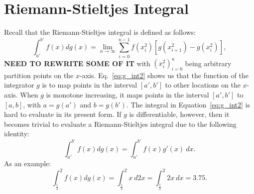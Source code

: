 \documentclass{article}
\theoremstyle{theorem}
\theoremstyle{definition}
\begin{document}

\section{Riemann-Stieltjes Integral}
Recall that the Riemann-Stieltjes integral is defined as follows:
\begin{equation}
\label{eq:g_int2}
\int_{a'}^{b'} f(x) dg(x) =  \lim_{n \rightarrow \infty}\sum_{i=0}^{n-1} f(x_i^2)[g(x_{i+1}^2)-g(x_{i}^2)], 
\end{equation}
\noindent
\textbf{NEED TO REWRITE SOME OF IT} with $(x_i^2)_{i=0}^n$ being arbitrary partition points on the $x$-axis. Eq.~\eqref{eq:g_int2} shows us that the function of the integrator $g$ is to
map points in the interval $[a',b']$ to other locations on the $x$-axis. When $g$ is monotone increasing, it maps points in the interval $[a',b']$ to $[a,b]$,
with $a = g(a')$ and $b = g(b')$. The integral in Equation~\ref{eq:g_int2} is hard to evaluate in its present form. If $g$ is differentiable, however, then it becomes trivial to 
evaluate a Riemann-Stieltjes integral due to the following identity:
\begin{equation}
\int_{a'}^{b'} f(x) dg(x) = \int_{a'}^{b'} f(x)g'(x)~dx.
\end{equation}
As an example:
\begin{equation}
\int_{\frac{1}{2}}^{2} f(x) dg(x)=\int_{\frac{1}{2}}^2 x~d2x = \int_{\frac{1}{2}}^2 2x~dx = 3.75. 
\end{equation}
\end{document}
